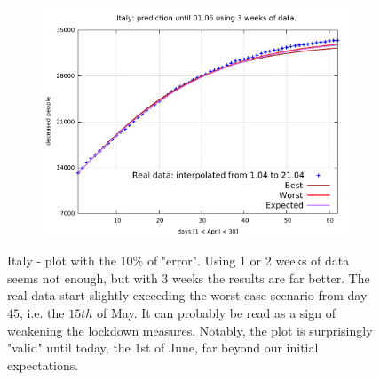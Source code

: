 \documentclass[8pt]{article}
\begin{document}
\begin{figure}[h!]
\begin{subfigure}[b]{0.45\linewidth}
  \includegraphics[width=\linewidth]{../err10p_simulations/it/1-21/1-21.pdf}
  \end{subfigure}
	\caption{Italy - plot with the $10\%$ of "error". Using 1 or 2 weeks
	of data seems not enough, but with 3 weeks the results are
	far better. The real data start slightly
	exceeding the worst-case-scenario
	from day $45$, i.e. the $15th$ of May. 
	It can probably be read as a sign
	of weakening the lockdown measures. Notably, the plot
	is surprisingly "valid" until today, the 1st of June, far beyond
	our initial expectations.}
\end{figure}
\end{document}

